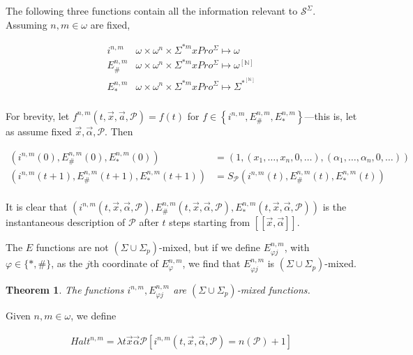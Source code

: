 \documentclass[a4paper, 12pt]{article}
\newtheorem{theorem}{Theorem}
\newtheorem{theorem}{Theorem}
\begin{document}
The following three functions contain all the information relevant to
$\mathcal{S}^{\Sigma}$. Assuming $n, m \in \omega$ are fixed, 

\begin{align*}
    i^{n, m} & \omega \times \omega^n \times \Sigma^{*m} x Pro^{\Sigma} \mapsto
    \omega \\
    E_{\#}^{n, m} & \omega \times \omega^n \times \Sigma^{*m} x Pro^{\Sigma} \mapsto
    \omega^{[\mathbb{N}]} \\
    E_{*}^{n, m} & \omega \times \omega^n \times \Sigma^{*m} x Pro^{\Sigma} \mapsto
    \Sigma^{*}^{[ \mathbb{N} ]} \\
\end{align*}

For brevity, let $f^{n, m}(t, \vec{x}, \vec{a}, \mathcal{P}) = f(t)$ for $f \in \left\{
i^{n, m}, E_\#^{n, m}, E_*^{n, m}\right\} $---this is, let as assume fixed
$\vec{x}, \vec{\alpha}, \mathcal{P}$. Then

\begin{align*}
    \left( i^{n, m}(0), E_{\#}^{n, m}(0), E_{*}^{n, m}(0) \right) &= \left( 1,
    \left( x_1, \ldots, x_n, 0, \ldots \right), \left( \alpha_1, \ldots,
\alpha_n, 0, \ldots \right)   \right)  \\ 
        \left( i^{n, m}(t+1), E_{\#}^{n, m}(t+1), E_{*}^{n, m}(t+1) \right) &=
        S_{\mathcal{P}}\left( i^{n, m}(t), E_{\#}^{n, m}(t), E_{*}^{n, m}(t)
   \right)  \\ 
\end{align*}

It is clear that $\left( i^{n, m}(t, \vec{x}, \vec{\alpha}, \mathcal{P}),
E_{\#}^{n, m}(t, \vec{x}, \vec{\alpha}, \mathcal{P}), E_{*}^{n,m}(t, \vec{x},
\vec{\alpha}, \mathcal{P}) \right) $ is the instantaneous description of
$\mathcal{P}$ after $t$ steps starting from $[\![ \vec{x}, \vec{\alpha} ]\!]$.

The $E$ functions are not $( \Sigma \cup \Sigma_p )$-mixed, but if we define $E^{n, m}_{\varphi
j}$, with $\varphi \in \{*, \#\}$, as the $j$th coordinate of $E^{n,
m}_{\varphi}$, we find that $E_{\varphi j}^{n, m}$ is $( \Sigma \cup \Sigma_p )$-mixed.

\begin{theorem}
    The functions $i^{n, m}, E_{\varphi j}^{n, m}$ are $(\Sigma \cup \Sigma_p)$-mixed functions.
\end{theorem}

Given $n, m \in  \omega$, we define 

\begin{align*}
    Halt^{n, m} = \lambda t\vec{x}\vec{\alpha} \mathcal{P} \left[ i^{n, m}(t,
    \vec{x}, \vec{\alpha}, \mathcal{P}) = n(\mathcal{P}) + 1  \right]
\end{align*}
\end{document}
